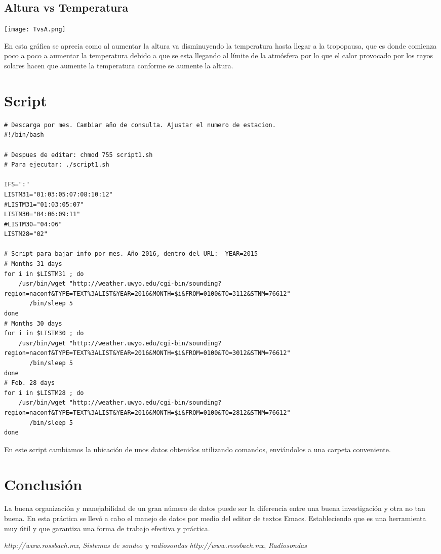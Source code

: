 \documentclass[12pt]{article}
\begin{document}
\newpage
\subsection{Altura vs Temperatura}

\texttt{[image: TvsA.png]}

En esta gráfica se aprecia como al aumentar la altura va disminuyendo la temperatura hasta llegar a la tropopausa, que es donde comienza poco a poco a aumentar la temperatura debido a que se esta llegando al límite de la atmósfera por lo que el calor provocado por los rayos solares hacen que aumente la temperatura conforme se aumente la altura.

\newpage
\section{Script}
\begin{verbatim}
# Descarga por mes. Cambiar año de consulta. Ajustar el numero de estacion.
#!/bin/bash
 
# Despues de editar: chmod 755 script1.sh
# Para ejecutar: ./script1.sh
 
IFS=":"
LISTM31="01:03:05:07:08:10:12"
#LISTM31="01:03:05:07"
LISTM30="04:06:09:11"
#LISTM30="04:06"
LISTM28="02"
 
# Script para bajar info por mes. Año 2016, dentro del URL:  YEAR=2015
# Months 31 days
for i in $LISTM31 ; do
    /usr/bin/wget "http://weather.uwyo.edu/cgi-bin/sounding?region=naconf&TYPE=TEXT%3ALIST&YEAR=2016&MONTH=$i&FROM=0100&TO=3112&STNM=76612"
       /bin/sleep 5
done
# Months 30 days
for i in $LISTM30 ; do
    /usr/bin/wget "http://weather.uwyo.edu/cgi-bin/sounding?region=naconf&TYPE=TEXT%3ALIST&YEAR=2016&MONTH=$i&FROM=0100&TO=3012&STNM=76612"
       /bin/sleep 5
done
# Feb. 28 days
for i in $LISTM28 ; do
    /usr/bin/wget "http://weather.uwyo.edu/cgi-bin/sounding?region=naconf&TYPE=TEXT%3ALIST&YEAR=2016&MONTH=$i&FROM=0100&TO=2812&STNM=76612"
       /bin/sleep 5
done
 \end{verbatim}

En este script cambiamos la ubicación de unos datos obtenidos utilizando comandos, enviándolos a una carpeta conveniente.



\newpage
\section{Conclusión}
La buena organización y manejabilidad de un gran número de datos puede ser la diferencia entre una buena investigación y otra no tan buena. En esta práctica se llevó a cabo el manejo de datos por medio del editor de textos Emacs. Estableciendo que es una herramienta muy útil y que garantiza una forma de trabajo efectiva y práctica.   

\begin{thebibliography}{9}
 \textit{http://www.rossbach.mx}, \textit{Sistemas de sondeo y radiosondas}
 \textit{http://www.rossbach.mx}, \textit{Radiosondas}
\end{thebibliography}
\end{document}
